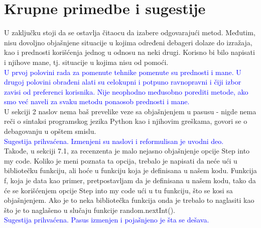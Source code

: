 \documentclass[a4paper]{report}
\newcommand{\odgovor}[1]{\textcolor{blue}{#1}}
\begin{document}
\section{Krupne primedbe i sugestije}
U zaključku stoji da se ostavlja čitaocu da izabere odgovarajući metod. Međutim, nisu dovoljno objašnjene situacije u kojima određeni debageri dolaze do izražaja, kao i prednosti korišćenja jednog u odnosu na neki drugi. Korisno bi bilo napisati i njihove mane, tj. situacije u kojima nisu od pomoći.\\
\odgovor{U prvoj polovini rada za pomenute tehnike pomenute su prednosti i mane. U drugoj polovini obrađeni alati su celokupni i potpuno ravnopravni i čiji izbor zavisi od preferenci korisnika. Nije neophodno međusobno porediti metode, ako smo već naveli za svaku metodu ponaosob prednosti i mane.}
\\
U sekciji 2 naslov  nema baš prevelike veze sa objašnjenjem u pasusu - nigde nema reči o sintaksi programskog jezika Python kao i njihovim greškama, govori se o debagovanju u opštem smislu. \\
\odgovor{Sugestija prihvaćena. Izmenjeni su naslovi i reformulisan je uvodni deo.}
\\
Takođe, u sekciji 7.1,  za recenzenta je malo nejasno objašnjenje opcije Step into my code. Koliko je meni poznata ta opcija, trebalo je napisati da neće ući u bibliotečku funkciju, ali hoće u funkciju koja je definisana u našem kodu. Funkcija f, koja je data kao primer, pretpostavljam da je definisana u našem kodu, tako da će se korišćenjem opcije Step into my code ući u tu funkciju, što se kosi sa objašnjenjem. Ako je to neka bibliotečka funkcija onda je trebalo to naglasiti kao što je to naglašeno u slučaju funkcije random.nextInt(). \\
\odgovor{Sugestija prihvaćena. Pasus izmenjen i pojašnjeno je šta se dešava.}
\end{document}
